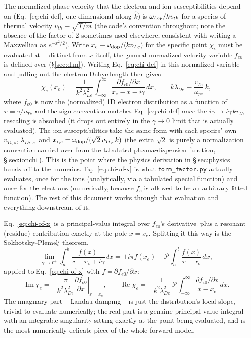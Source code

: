 \documentclass[11pt]{article}
\newcommand{\file}[1]{\texttt{#1}}
\begin{document}
The normalized phase velocity that the electron and ion susceptibilities depend on
(Eq.~\ref{eq:chi-def}, one-dimensional along $\hat k$) is $\omega_{\rm dop}/kv_{th}$ for a
species of thermal velocity $v_{th}\equiv\sqrt{T/m}$ (the code's convention throughout;
note the absence of the factor of 2 sometimes used elsewhere, consistent with writing a
Maxwellian as $e^{-x^2/2}$). Write $x_e\equiv\omega_{\rm dop}/(kv_{Te})$ for the specific
point $\chi_e$ must be evaluated at -- distinct from $x$ itself, the general
normalized-velocity variable $f_{e0}$ is defined over (\S\ref{sec:dlm}). Writing
Eq.~\ref{eq:chi-def} in this normalized variable and pulling out the electron Debye length
then gives
\begin{equation}\label{eq:chi-of-x}
  \chi_e(x_e) = \frac{1}{k^2\lambda_{De}^2}\int_{-\infty}^{\infty}
  \frac{\partial f_{e0}/\partial x}{x_e - x - i\gamma}\,dx, \qquad
  k\lambda_{De}\equiv \frac{v_{Te}}{\omega_{pe}}\,k,
\end{equation}
where $f_{e0}$ is now the (normalized) 1D electron distribution as a function of $x=v/v_{Te}$
and the sign convention matches Eq.~\ref{eq:chi-def} once the $i\gamma\to i\gamma\,
kv_{th}$ rescaling is absorbed (it drops out entirely in the $\gamma\to0$ limit that is
actually evaluated). The ion susceptibilities take the same form with each species' own
$v_{Ti,s}$, $\lambda_{Di,s}$, and $x_{i,s}=\omega_{\rm dop}/(\sqrt2\,v_{Ti,s}k)$ (the
extra $\sqrt2$ is purely a normalization convention carried over from the tabulated
plasma-dispersion function, \S\ref{sec:ionchi}). This is the point where the physics
derivation in \S\ref{sec:physics} hands off to the numerics: Eq.~\ref{eq:chi-of-x} is what
\file{form\_factor.py} actually evaluates, once for the ions (analytically, via a
tabulated special function) and once for the electrons (numerically, because $f_e$ is
allowed to be an arbitrary fitted function). The rest of this document works through that
evaluation and everything downstream of it.

Eq.~\ref{eq:chi-of-x} is a principal-value integral over $f_{e0}$'s derivative, plus a
resonant (residue) contribution exactly at the pole $x=x_e$. Splitting it this way is the
Sokhotsky--Plemelj theorem,
\begin{equation}
  \lim_{\gamma\to0^+}\int_a^b\frac{f(x)}{x-x_e\mp i\gamma}\,dx
  = \pm i\pi f(x_e) + \mathcal P\!\int_a^b\frac{f(x)}{x-x_e}\,dx,
\end{equation}
applied to Eq.~\ref{eq:chi-of-x} with $f=\partial f_{e0}/\partial x$:
\begin{equation}\label{eq:chi-im-re}
  \operatorname{Im}\chi_e = -\frac{\pi}{k^2\lambda_{De}^2}\left.\frac{\partial f_{e0}}{\partial x}\right\vert_{x=x_e},
  \qquad
  \operatorname{Re}\chi_e = -\frac{1}{k^2\lambda_{De}^2}\,\mathcal P\!\int_{-\infty}^{\infty}
  \frac{\partial f_{e0}/\partial x}{x-x_e}\,dx.
\end{equation}
The imaginary part -- Landau damping -- is just the distribution's local slope, trivial to
evaluate numerically; the real part is a genuine principal-value integral with an
integrable singularity sitting exactly at the point being evaluated, and is the most
numerically delicate piece of the whole forward model.
\end{document}
